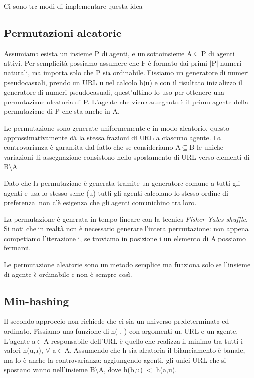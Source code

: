 \documentclass[12pt,italian]{report}
\begin{document}
Ci sono tre modi di implementare questa idea

\subsection{Permutazioni aleatorie}
\label{Permutazioni aleatorie}    
Assumiamo esista un insieme P di agenti, e un sottoinsieme A$\subseteq$P di agenti attivi. Per semplicità possiamo assumere che P è formato dai primi $|$P$|$ numeri naturali, ma importa solo che P sia ordinabile. Fissiamo un generatore di numeri pseudocasuali, prendo un URL u nel calcolo h(u) e con il risultato inizializzo il generatore di numeri pseudocasuali, quest'ultimo lo uso per ottenere una permutazione aleatoria di P. L'agente che viene assegnato è il primo agente della permutazione di P che sta anche in A. 

Le permutazione sono generate uniformemente e in modo aleatorio, questo approssimativamente dà la stessa frazioni di URL a ciascuno agente. La controvarianza è garantita dal fatto che se consideriamo A$\subseteq${B} le uniche variazioni di assegnazione consistono nello spostamento di URL verso elementi di B$\setminus${A}

Dato che la permutazione è generata tramite un generatore comune a tutti gli agenti e usa lo stesso seme (u) tutti gli agenti calcolano lo stesso ordine di preferenza, non c'è esigenza che gli agenti comunichino tra loro.

La permutazione è generata in tempo lineare con la tecnica \textit{Fisher-Yates shuffle}.
Si noti che in realtà non è necessario generare l'intera permutazione: non appena competiamo l'iterazione i, se troviamo in posizione i un elemento di A possiamo fermarci. 

Le permutazione aleatorie sono un metodo semplice ma funziona solo se l'insieme di agente è ordinabile e non è sempre così. 

\subsection{Min-hashing}
\label{min-hashing} 
Il secondo approccio non richiede che ci sia un universo predeterminato ed ordinato.
Fissiamo una funzione di h(-,-) con argomenti un URL e un agente. L'agente a$\in$A responsabile dell'URL è quello che realizza il minimo tra tutti i valori h(u,a),  $\forall$ a$\in$A.
Assumendo che h sia aleatoria il bilanciamento è banale, ma lo è anche la controvarianza: aggiungendo agenti, gli unici URL che si spostano vanno nell'insieme B$\setminus${A}, dove h(b,u) $<$ h(a,u).
\end{document}

